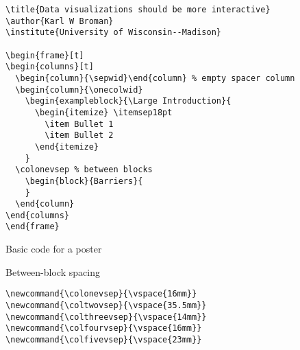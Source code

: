 \documentclass[12pt,t]{beamer}
\begin{document}
\newsavebox{\codeboxseven}
\begin{lrbox}{\codeboxseven}
\begin{lstlisting}
\title{Data visualizations should be more interactive}
\author{Karl W Broman}
\institute{University of Wisconsin--Madison}

\begin{frame}[t]
\begin{columns}[t]
  \begin{column}{\sepwid}\end{column} % empty spacer column
  \begin{column}{\onecolwid}
    \begin{exampleblock}{\Large Introduction}{
      \begin{itemize} \itemsep18pt
        \item Bullet 1
        \item Bullet 2
      \end{itemize}
    }
  \colonevsep % between blocks
    \begin{block}{Barriers}{
    }
  \end{column}
\end{columns}
\end{frame}
\end{lstlisting}
\end{lrbox}

\begin{frame}[c]{Basic code for a poster}

\usebox{\codeboxseven}

\end{frame}



\begin{frame}[c,fragile]{Between-block spacing}

\begin{lstlisting}
\newcommand{\colonevsep}{\vspace{16mm}}
\newcommand{\coltwovsep}{\vspace{35.5mm}}
\newcommand{\colthreevsep}{\vspace{14mm}}
\newcommand{\colfourvsep}{\vspace{16mm}}
\newcommand{\colfivevsep}{\vspace{23mm}}
\end{lstlisting}

\end{frame}
\end{document}
